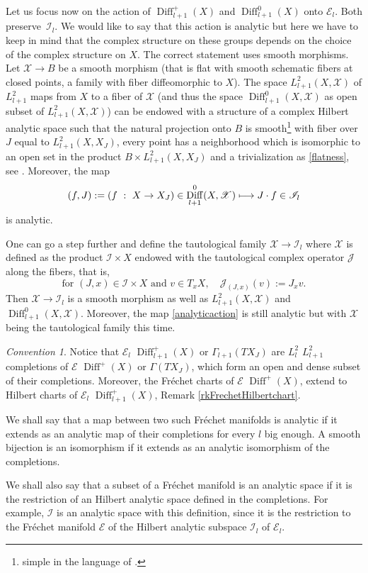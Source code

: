 \documentclass[JEP,XML,SOM,Unicode]{cedram}
\let\mathcal\mathscr
\def\mto{\mathchoice{\longmapsto}{\mapsto}{\mapsto}{\mapsto}}
\DeclareMathOperator{\Diff}{Diff}
\theoremstyle{plain}
\theoremstyle{definition}
\theoremstyle{remark}
\newtheorem{convention}[theorem]{Convention}
\numberwithin{equation}{section}
\newcommand{\cI}{\mathcal{I}}
\begin{document}
Let us focus now on the action of $\Diff^+_{l+1}(X)$ and $\Diff^{0}_{l+1}(X)$ onto $\mathcal E_l$. Both preserve~$\cI_l$. We would like to say that this action is analytic but here we have to keep in mind that the complex structure on these groups depends on the choice of the complex structure on $X$. The correct statement uses smooth morphisms. Let $\mathcal X\to B$ be a smooth morphism (that is flat with smooth schematic fibers at closed points, \eg a family with fiber diffeomorphic to $X$). The space $L^2_{l+1}(X,\mathcal X)$ of $L^2_{l+1}$ maps from $X$ to a fiber of $\mathcal X$ (and thus the space $\Diff^0_{l+1} (X,\mathcal X)$ as open subset of $L^2_{l+1}(X,\mathcal X)$) can be endowed with a structure of a complex Hilbert analytic space such that the natural projection onto $B$ is smooth\footnote{simple in the language of \cite{DouadyBourbaki}.} with fiber over $J$ equal to $L^2_{l+1}(X,X_J)$, \ie every point has a neighborhood which is isomorphic to an open set in the product $B\times L^2_{l+1}(X,X_J)$ and a trivialization as \eqref{flatness}, see \cite{DouadyBourbaki}. Moreover, the map
\begin{equation}
\label{analyticaction}
(f,J):=(f\ :\ X\to X_J)\in\Diff^0_{l+1} (X,\mathcal X)\mto J\cdot f\in \cI_l
\end{equation}
is analytic.

One can go a step further and define the tautological family $\mathcal X\to\cI_l$ where $\mathcal X$ is defined as the product $\cI\times X$ endowed with the tautological complex operator $\mathcal J$ along the fibers, that is,
\begin{equation}
\label{J rond}
\text{for }(J,x)\in \cI\times X\text{ and } v\in T_xX,\quad \mathcal J_{(J,x)}(v):=J_xv.
\end{equation}
Then $\mathcal X\to\cI_l$ is a smooth morphism as well as $L^2_{l+1}(X,\mathcal X)$ and $\Diff^0_{l+1} (X,\mathcal X)$. Moreover, the map \eqref{analyticaction} is still analytic but with $\mathcal X$ being the tautological family this time.

\begin{convention}
\label{ConvFrH}
Notice that $\mathcal E_l$ \resp $\Diff^+_{l+1} (X)$ or $\Gamma_{l+1}(TX_J)$ are $L^2_l$ \resp $L^2_{l+1}$ completions of $\mathcal E$ \resp $\Diff^+ (X)$ or $\Gamma(TX_J)$, which form an open and dense subset of their completions. Moreover, the Fréchet charts of $\mathcal E$ \resp $\Diff^+ (X)$, extend to Hilbert charts of $\mathcal E_l$ \resp $\Diff^+_{l+1} (X)$, \cf Remark \ref{rkFrechetHilbertchart}.

We shall say that a map between two such Fréchet manifolds is analytic if it extends as an analytic map of their completions for every $l$ big enough. A smooth bijection is an isomorphism if it extends as an analytic isomorphism of the completions.

We shall also say that a subset of a Fréchet manifold is an analytic space if it is the restriction of an Hilbert analytic space defined in the completions. For example, $\cI$ is an analytic space with this definition, since it is the restriction to the Fréchet manifold $\mathcal E$ of the Hilbert analytic subspace $\cI_l$ of $\mathcal E_l$.
\end{convention}
\end{document}
